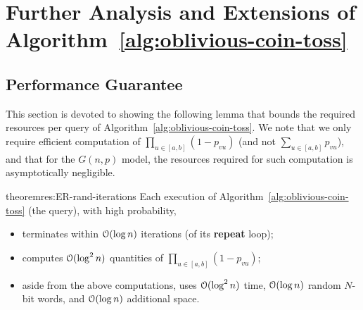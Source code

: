 \section{Further Analysis and Extensions of Algorithm~\ref{alg:oblivious-coin-toss}}
\label{sec:reroll-cont}

\subsection{Performance Guarantee}
This section is devoted to showing the following lemma that bounds the required resources per query of Algorithm~\ref{alg:oblivious-coin-toss}. We note that we only require efficient computation of $\prod_{u \in [a,b]} (1-p_{vu})$ (and not $\sum_{u \in [a,b]} p_{vu}$), and that for the $G(n,p)$ model, the resources required for such computation is asymptotically negligible.

\begin{restatable}{theorem}{res:ER-rand-iterations}\label{thm:ER-rand-iterations}
Each execution of Algorithm~\ref{alg:oblivious-coin-toss} (the  query), with high probability,
\begin{itemize}
\item terminates within $\mathcal{O}(\log n)$ iterations (of its \textup{\textbf{repeat}} loop);
\item computes $\mathcal{O}(\log^2 n)$ quantities of $\prod_{u \in [a,b]} (1-p_{vu})$;
\item aside from the above computations, uses $\mathcal{O}(\log^2 n)$ time, $\mathcal{O}(\log n)$ random $N$-bit words, and $\mathcal{O}(\log n)$ additional space.
\end{itemize}
\end{restatable}

